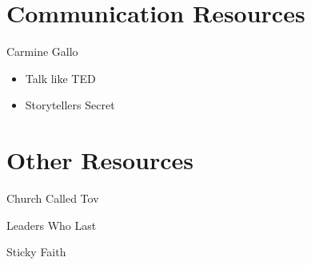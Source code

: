 \documentclass[
]{book}
\providecommand{\tightlist}{%
  \setlength{\itemsep}{0pt}\setlength{\parskip}{0pt}}
\begin{document}
\hypertarget{communication-resources}{%
\section{Communication Resources}\label{communication-resources}}

Carmine Gallo

\begin{itemize}
\tightlist
\item
  Talk like TED
\item
  Storytellers Secret
\end{itemize}

\hypertarget{other-resources}{%
\section{Other Resources}\label{other-resources}}

Church Called Tov

Leaders Who Last

Sticky Faith
\end{document}
